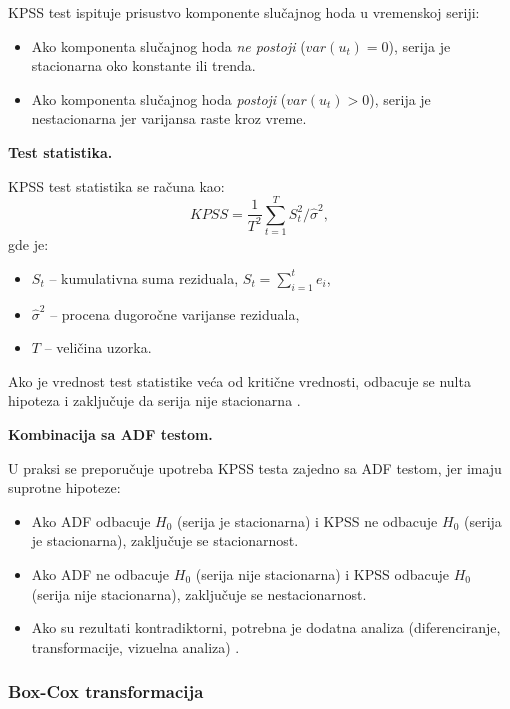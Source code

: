\documentclass[12pt]{article}
\begin{document}
KPSS test ispituje prisustvo komponente slučajnog hoda u vremenskoj seriji:

\begin{itemize}
    \item Ako komponenta slučajnog hoda \textit{ne postoji} ($var(u_t)=0$), serija je stacionarna oko konstante ili trenda.
    \item Ako komponenta slučajnog hoda \textit{postoji} ($var(u_t)>0$), serija je nestacionarna jer varijansa raste kroz vreme.
\end{itemize}

\bigskip

\noindent \textbf{Test statistika.}

KPSS test statistika se računa kao:
\[
KPSS = \frac{1}{T^2} \sum_{t=1}^{T} S_t^2 / \hat{\sigma}^2,
\]
gde je:
\begin{itemize}
    \item $S_t$ – kumulativna suma reziduala, $S_t = \sum_{i=1}^{t} e_i$,
    \item $\hat{\sigma}^2$ – procena dugoročne varijanse reziduala,
    \item $T$ – veličina uzorka.
\end{itemize}

\noindent Ako je vrednost test statistike veća od kritične vrednosti, odbacuje se nulta hipoteza i zaključuje da serija nije stacionarna \cite{kpss1992}.

\bigskip

\noindent \textbf{Kombinacija sa ADF testom.}

U praksi se preporučuje upotreba KPSS testa zajedno sa ADF testom, jer imaju suprotne hipoteze:

\begin{itemize}
    \item Ako ADF odbacuje $H_0$ (serija je stacionarna) i KPSS ne odbacuje $H_0$ (serija je stacionarna), zaključuje se stacionarnost.
    \item Ako ADF ne odbacuje $H_0$ (serija nije stacionarna) i KPSS odbacuje $H_0$ (serija nije stacionarna), zaključuje se nestacionarnost.
    \item Ako su rezultati kontradiktorni, potrebna je dodatna analiza (diferenciranje, transformacije, vizuelna analiza) \cite{dickey1979, kpss1992}.
\end{itemize}

\subsubsection{Box-Cox transformacija}
\end{document}
